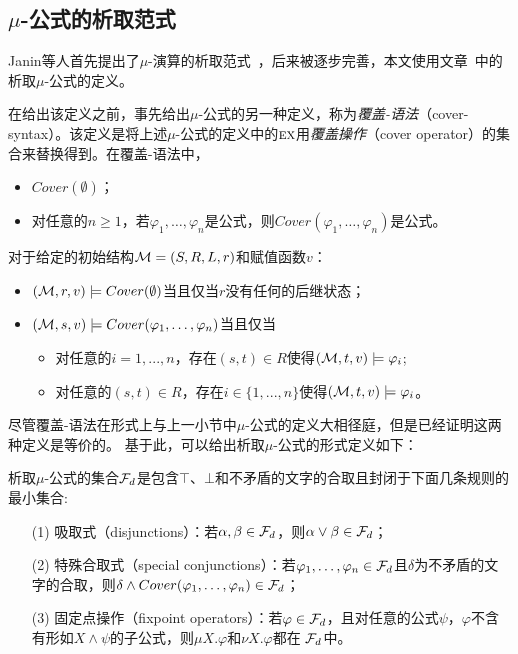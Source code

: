 \subsection{$\mu$-公式的析取范式}
Janin等人首先提出了$\mu$-演算的析取范式~\cite{janin1995automata}，后来被逐步完善，本文使用文章~\cite{d2006modal}中的析取$\mu$-公式的定义。

在给出该定义之前，事先给出$\mu$-公式的另一种定义，称为\emph{覆盖-语法}（cover-syntax）。该定义是将上述$\mu$-公式的定义中的$\textsc{e}\textsc{x}$用\emph{覆盖操作}（cover operator）的集合来替换得到。在覆盖-语法中，
\begin{itemize}
	\item $Cover(\emptyset)$；
	\item 对任意的$n\geq 1$，若$\varphi_1,\dots, \varphi_n$是公式，则$Cover(\varphi_1, \dots, \varphi_n)$是公式。
\end{itemize}
对于给定的初始结构${\cal M}=(S,R,L,r)$和赋值函数$v$：
\begin{itemize}
	\item $({\cal M},r,v) \models Cover(\emptyset)$当且仅当$r$没有任何的后继状态；
	\item $({\cal M}, s,v ) \models Cover(\varphi_1, \dots, \varphi_n)$当且仅当
	\begin{itemize}
		\item 对任意的$i = 1, . . . , n$，存在$(s, t) \in R$使得$({\cal M}, t,v) \models \varphi_i$;
		\item 对任意的$(s, t) \in R$，存在$i\in \{1, . . . , n\}$使得$({\cal M}, t,v) \models \varphi_i$。
	\end{itemize}
\end{itemize}

尽管覆盖-语法在形式上与上一小节中$\mu$-公式的定义大相径庭，但是已经证明这两种定义是等价的\cite{d2006modal}。
基于此，可以给出析取$\mu$-公式的形式定义如下：
\begin{definition}
	析取$\mu$-公式的集合${\cal F}_d$是包含$\top$、$\bot$和不矛盾的文字的合取且封闭于下面几条规则的最小集合:
	\begin{itemize}
		\item[(1)] 吸取式（disjunctions）：若$\alpha, \beta \in {\cal F}_d$，则$\alpha \vee \beta \in {\cal F}_d$；
		\item[(2)] 特殊合取式（special conjunctions）：若$\varphi_1, \dots, \varphi_n\in {\cal F}_d$且$\delta$为不矛盾的文字的合取，则$\delta \wedge Cover(\varphi_1, \dots, \varphi_n) \in {\cal F}_d$；
		\item[(3)] 固定点操作（fixpoint operators）：若$\varphi\in  {\cal F}_d$，且对任意的公式$\psi$，$\varphi$不含有形如$X \wedge \psi$的子公式，则$\mu X. \varphi$和$\nu X. \varphi$都在 ${\cal F}_d$中。
	\end{itemize}	
\end{definition}

